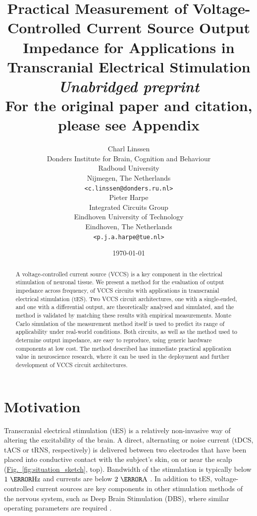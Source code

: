 \documentclass[10pt]{article}
\title{Practical Measurement of Voltage-Controlled Current Source Output Impedance for Applications in Transcranial Electrical Stimulation\\[.5cm]\colorbox{yellow!30}{\emph{Unabridged preprint}}\\[.1cm]\colorbox{yellow!30}{\small For the original paper and citation, please see Appendix}}
\author{Charl Linssen\\
\small Donders Institute for Brain, Cognition and Behaviour\\
\small Radboud University\\
\small Nijmegen, The Netherlands\\
\small \texttt{<c.linssen@donders.ru.nl>}\\[0.5cm]
Pieter Harpe\\
\small Integrated Circuits Group\\
\small Eindhoven University of Technology\\
\small Eindhoven, The Netherlands\\
\small \texttt{<p.j.a.harpe@tue.nl>}\\[0.5cm]
\date{\today}
}
\newcommand{\brieffiglink}[1]{\hyperref[#1]{Fig.~\ref*{#1}}}
\begin{document}
\maketitle

\begin{abstract}
\noindent A voltage-controlled current source (VCCS) is a key component in the electrical stimulation of neuronal tissue. We present a method for the evaluation of output impedance across frequency, of VCCS circuits with applications in transcranial electrical stimulation (tES). Two VCCS circuit architectures, one with a single-ended, and one with a differential output, are theoretically analysed and simulated, and the method is validated by matching these results with empirical measurements. Monte Carlo simulation of the measurement method itself is used to predict its range of applicability under real-world conditions. Both circuits, as well as the method used to determine output impedance, are easy to reproduce, using generic hardware components at low cost. The method described has immediate practical application value in neuroscience research, where it can be used in the deployment and further development of VCCS circuit architectures.
\end{abstract}

\tableofcontents


\section{Motivation}
\label{sec:motivation}

Transcranial electrical stimulation (tES) is a relatively non-invasive way of altering the excitability of the brain. A direct, alternating or noise current (tDCS, tACS or tRNS, respectively) is delivered between two electrodes that have been placed into conductive contact with the subject's skin, on or near the scalp (\brieffiglink{fig:situation_sketch}, top). Bandwidth of the stimulation is typically below $1~\kilo\hertz$ and currents are below $2~\milli\ampere$ \cite{pmid26652115}\cite{pmid19109497}. In addition to tES, voltage-controlled current sources are key components in other stimulation methods of the nervous system, such as Deep Brain Stimulation (DBS), where similar operating parameters are required \cite{dbs}.
\end{document}
